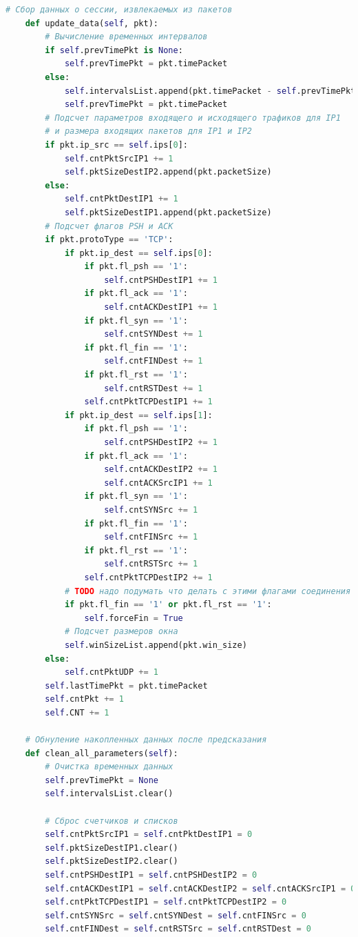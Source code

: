 \documentclass[spec, och, diploma]{SCWorks}
\begin{document}
\begin{lstlisting}[language=Python]
    # Сбор данных о сессии, извлекаемых из пакетов
    def update_data(self, pkt):
        # Вычисление временных интервалов
        if self.prevTimePkt is None:
            self.prevTimePkt = pkt.timePacket
        else:
            self.intervalsList.append(pkt.timePacket - self.prevTimePkt)
            self.prevTimePkt = pkt.timePacket
        # Подсчет параметров входящего и исходящего трафиков для IP1
        # и размера входящих пакетов для IP1 и IP2
        if pkt.ip_src == self.ips[0]:
            self.cntPktSrcIP1 += 1
            self.pktSizeDestIP2.append(pkt.packetSize)
        else:
            self.cntPktDestIP1 += 1
            self.pktSizeDestIP1.append(pkt.packetSize)
        # Подсчет флагов PSH и ACK
        if pkt.protoType == 'TCP':
            if pkt.ip_dest == self.ips[0]:
                if pkt.fl_psh == '1':
                    self.cntPSHDestIP1 += 1
                if pkt.fl_ack == '1':
                    self.cntACKDestIP1 += 1
                if pkt.fl_syn == '1':
                    self.cntSYNDest += 1
                if pkt.fl_fin == '1':
                    self.cntFINDest += 1
                if pkt.fl_rst == '1':
                    self.cntRSTDest += 1
                self.cntPktTCPDestIP1 += 1
            if pkt.ip_dest == self.ips[1]:
                if pkt.fl_psh == '1':
                    self.cntPSHDestIP2 += 1
                if pkt.fl_ack == '1':
                    self.cntACKDestIP2 += 1
                    self.cntACKSrcIP1 += 1
                if pkt.fl_syn == '1':
                    self.cntSYNSrc += 1
                if pkt.fl_fin == '1':
                    self.cntFINSrc += 1
                if pkt.fl_rst == '1':
                    self.cntRSTSrc += 1
                self.cntPktTCPDestIP2 += 1
            # TODO надо подумать что делать с этими флагами соединения
            if pkt.fl_fin == '1' or pkt.fl_rst == '1':
                self.forceFin = True
            # Подсчет размеров окна
            self.winSizeList.append(pkt.win_size)
        else:
            self.cntPktUDP += 1
        self.lastTimePkt = pkt.timePacket
        self.cntPkt += 1
        self.CNT += 1

    # Обнуление накопленных данных после предсказания
    def clean_all_parameters(self):
        # Очистка временных данных
        self.prevTimePkt = None
        self.intervalsList.clear()
        
        # Сброс счетчиков и списков
        self.cntPktSrcIP1 = self.cntPktDestIP1 = 0
        self.pktSizeDestIP1.clear()
        self.pktSizeDestIP2.clear()
        self.cntPSHDestIP1 = self.cntPSHDestIP2 = 0
        self.cntACKDestIP1 = self.cntACKDestIP2 = self.cntACKSrcIP1 = 0
        self.cntPktTCPDestIP1 = self.cntPktTCPDestIP2 = 0
        self.cntSYNSrc = self.cntSYNDest = self.cntFINSrc = 0
        self.cntFINDest = self.cntRSTSrc = self.cntRSTDest = 0
        

\end{lstlisting}
\end{document}
